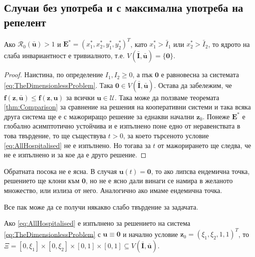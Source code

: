 \subsection{Случаи без употреба и с максимална употреба на репелент}

\begin{proposition}
  Ако $\mathscr{R}_0(\bar{\mathbf{u}}) > 1$ и $\mathbf{E}^* = (x_1^*, x_2^*, y_1^*, y_2^*)^T$, като $x_1^* > \bar{I}_1$ или $x_2^* > \bar{I}_2$, то ядрото на слаба инвариантност е тривиалното, т.е. $V(\bar{\mathbf{I}}, \bar{\mathbf{u}}) = \{\mathbf{0}\}$.
\end{proposition}

\begin{proof}
  Наистина, по определение $I_1, I_2 \geq 0$, а пък $\mathbf{0}$ е равновесна за системата \eqref{eq:TheDimensionlessProblem}. Така $\mathbf{0} \in V(\bar{\mathbf{I}}, \bar{\mathbf{u}})$.
  Остава да забележим, че $\mathbf{f}(\mathbf{z}, \bar{\mathbf{u}}) \leq \mathbf{f}(\mathbf{z}, \mathbf{u})$ за всички $\mathbf{u} \in \mathscr{U}$.
  Така може да ползваме теоремата \eqref{thm:Comparison} за сравнение на решения на кооперативни системи и така всяка друга система ще е с мажориращо решение за еднакви начални $\mathbf{z}_0$.
  Понеже $\mathbf{E}^*$ е глобално асимптотично устойчива и е изпълнено поне едно от неравенствата в това твърдение, то ще съществува $t > 0$, за което търсеното условие \eqref{eq:AllHospitalised} не е изпълнено.
  Но тогава за $t$ от мажорирането ще следва, че не е изпълнено и за кое да е друго решение.
\end{proof}

Обратната посока не е ясна. В случая $\mathbf{u}(t)=\mathbf{0}$, то ако липсва ендемична точка, решението ще клони към $\mathbf{0}$, но не е ясно дали винаги се намира в желаното множество, или излиза от него. Аналогично ако имаме ендемична точка.

Все пак може да се получи някакво слабо твърдение за задачата.

\begin{proposition}
  Ако \eqref{eq:AllHospitalised} е изпълнено за решението на система \eqref{eq:TheDimensionlessProblem} с $\mathbf{u} \equiv \mathbf{0}$ и начално условие $\mathbf{z}_0 = (\xi_1, \xi_2, 1, 1)^T$, то $\Xi = [0, \xi_1] \times [0, \xi_2] \times [0, 1] \times [0, 1] \subseteq V(\bar{\mathbf{I}}, \bar{\mathbf{u}})$.
\end{proposition}

